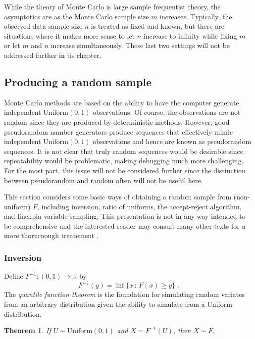 \documentclass[12pt]{article}
\theoremstyle{plain}
\newtheorem{thm}{Theorem}[section]
\theoremstyle{definition}
\theoremstyle{remark}
\begin{document}
While the theory of Monte Carlo is large sample frequentist theory,
the asymptotics are as the Monte Carlo sample size $m$ increases.
Typically, the observed data sample size $n$ is treated as fixed and
known, but there are situations where it makes more sense to let $n$
increase to infinity while fixing $m$ or let $m$ and $n$ increase
simultaneously. These last two settings will not be addressed further
in tis chapter.

\subsection{Producing a random sample}
\label{gofmc:sec:Producing}

Monte Carlo methods are based on the ability to have the computer
generate independent $\text{Uniform}(0,1)$ observations.  Of course,
the observations are not random since they are produced by
deterministic methods.  However, good pseudorandom number generators
produce sequences that effectively mimic independent
$\text{Uniform}(0,1)$ observations and hence are known as pseudorandom
sequences.  It is not clear that truly random sequences would be
desirable since repeatability would be problematic, making debugging
much more challenging.  For the most part, this issue will not be
considered further since the distinction between pseudorandom and
random often will not be useful here.

This section considers some basic ways of obtaining a random sample
from (non-uniform) $F$, including inversion, ratio of uniforms, the
accept-reject algorithm, and linchpin variable sampling.  This
presentation is not in any way intended to be comprehensive and the
interested reader may consult many other texts for a more thoruroough
treatement \cite[e.g.][]{devr:1986, fish:1996, robe:case:2004}.

\subsubsection{Inversion} 
Define $F^{-1} : (0,1) \to \mathbb{R}$ by
$$
F^{-1}(y) = \inf \{ x\, : \, F(x) \ge y\} \; .
$$
The \textit{quantile function theorem} is the foundation for
simulating random variates from an arbitrary distribution given the
ability to simulate from a Uniform distribution.

\begin{thm}\label{thm:quantile function}
If $U \sim \text{Uniform}(0,1)$ and $X = F^{-1}(U)$, then $X \sim F$.
\end{thm}
\end{document}
